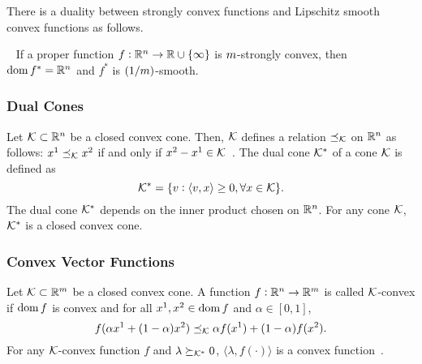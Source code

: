 There is a duality between strongly convex functions and Lipschitz smooth convex functions as follows. %
\begin{proposition}~\cite[Thm.~X.4.2.1, Thm.~X.4.2.2]{hiriart1993convex}
\label{prop:duality}
    If a proper function $f: \mathbb{R}^n \rightarrow \mathbb{R} \cup \{\infty\}$ is $m$-strongly convex, then $\operatorname{dom}{f^*} = \mathbb{R}^n$ and $f^*$ is $(1/m)$-smooth.
\end{proposition}


\subsubsection{Dual Cones}
\label{subsubsec:dual-cones}

Let $\mathcal{K} \subset \mathbb{R}^n$ be a closed convex cone.
Then, $\mathcal{K}$ defines a relation $\preceq_{\mathcal{K}}$ on $\mathbb{R}^n$ as follows:
$x^1 \preceq_{\mathcal{K}} x^2$ if and only if $x^2-x^1 \in \mathcal{K}$~\cite[Sec.~2.4]{boyd2004convex}.
The dual cone $\mathcal{K}^*$ of a cone $\mathcal{K}$ is defined as~\cite[Sec.~2.6]{boyd2004convex}
\begin{equation}
\label{eq:dual-cone-def}
    \mathcal{K}^* = \{v: \langle v, x\rangle \geq 0, \forall x \in \mathcal{K}\}.
\end{equation}
The dual cone $\mathcal{K}^*$ depends on the inner product chosen on $\mathbb{R}^n$.
For any cone $\mathcal{K}$, $\mathcal{K}^*$ is a closed convex cone. %


\subsubsection{Convex Vector Functions}
\label{subsubsec:convex-vector-functions}

Let $\mathcal{K} \subset \mathbb{R}^m$ be a closed convex cone.
A function $f: \mathbb{R}^n \rightarrow \mathbb{R}^m$ is called $\mathcal{K}$-convex if $\operatorname{dom}{f}$ is convex and for all $x^1, x^2 \in \operatorname{dom}{f}$ and $\alpha \in [0, 1]$,
\begin{equation}
\label{eq:k-convex-function}
    f(\alpha x^1 + (1-\alpha) x^2) \preceq_{\mathcal{K}} \alpha f(x^1) + (1-\alpha) f(x^2).
\end{equation}
For any $\mathcal{K}$-convex function $f$ and $\lambda \succeq_{\mathcal{K}^*} 0$, $\langle \lambda, f(\cdot) \rangle$ is a convex function~\cite[Sec.~3.6.2]{boyd2004convex}.


